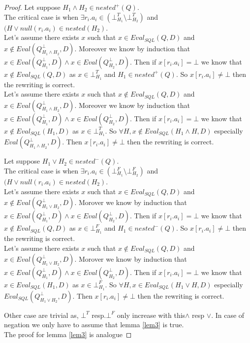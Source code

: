 	\begin{proof}
		Let suppose $H_1 \land H_2 \in nested^+(Q)$.
		\\The critical case is when $\exists r_i.a_i \in (\bot^T_{H_1} \setminus \bot^T_{H_2})$ and $(H\lor null(r_i.a_i)\in nested(H_2)$. 
		\\Let's assume there exists $x$ such that $x \in Eval_{SQL}(Q,D)$ and $x \notin Eval(Q^\bot_{H_1\land H_2},D)$. Moreover we know by induction that  $x \in Eval(Q^\bot_{H_1},D) \land x \in Eval(Q^\bot_{H_2},D)$. Then if $x[r_i.a_i] = \bot$ we know that $x \notin Eval_{SQL}(Q,D)$ as $x \in \bot^T_{H_1}$ and $H_1 \in nested^+(Q)$. So $x[r_i.a_i] \neq \bot$ then the rewriting is correct.
		\\Let's assume there exists $x$ such that $x \notin Eval_{SQL}(Q,D)$ and $x \in Eval(Q^\bot_{H_1\land H_2},D)$. Moreover we know by induction that  $x \in Eval(Q^\bot_{H_1},D) \land x \in Eval(Q^\bot_{H_2},D)$. Then if $x[r_i.a_i] = \bot$ we know that $x \notin Eval_{SQL}(H_1,D)$ as $x \in \bot^T_{H_1}$. So $\forall H , x \notin Eval_{SQL}(H_1\land H,D)$ especially $Eval(Q^\bot_{H_1\land H_2},D)$. Then $x[r_i.a_i] \neq \bot$ then the rewriting is correct.
		
		Let suppose $H_1 \lor H_2 \in nested^-(Q)$.
		\\The critical case is when $\exists r_i.a_i \in (\bot^F_{H_1} \setminus \bot^F_{H_2})$ and $(H\lor null(r_i.a_i)\in nested(H_2)$. 
		\\Let's assume there exists $x$ such that $x \in Eval_{SQL}(Q,D)$ and $x \notin Eval(Q^\bot_{H_1\lor H_2},D)$. Morover we know by induction that  $x \in Eval(Q^\bot_{H_1},D) \land x \in Eval(Q^\bot_{H_2},D)$. Then if $x[r_i.a_i] = \bot$ we know that $x \notin Eval_{SQL}(Q,D)$ as $x \in \bot^F_{H_1}$ and $H_1 \in nested^-(Q)$. So $x[r_i.a_i] \neq \bot$ then the rewriting is correct.
		\\Let's assume there exists $x$ such that $x \notin Eval_{SQL}(Q,D)$ and $x \in Eval(Q^\bot_{H_1\lor H_2},D)$. Morover we know by induction that  $x \in Eval(Q^\bot_{H_1},D) \land x \in Eval(Q^\bot_{H_2},D)$. Then if $x[r_i.a_i] = \bot$ we know that $x \in Eval_{SQL}(H_1,D)$ as $x \in \bot^F_{H_1}$. So $\forall H , x \in Eval_{SQL}(H_1\lor H,D)$ especially $Eval_{SQL}(Q^\bot_{H_1\lor H_2},D)$. Then $x[r_i.a_i] \neq \bot$ then the rewriting is correct.
		
		Other case are trivial as, $\bot^T$ resp.$\bot^F$ only increase with this$\land$ resp $\lor$. In case of negation we only have to assume that lemma \ref{lem3} is true.
		\\The proof for lemma \ref{lem3} is analogue
	\end{proof}
	

